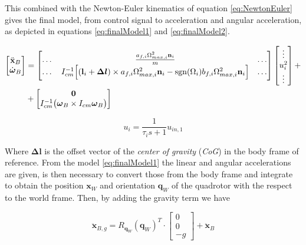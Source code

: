 \noindent This combined with the Newton-Euler kinematics of equation \eqref{eq:NewtonEuler} gives the final model, from control signal to acceleration and angular acceleration, as depicted in equations \eqref{eq:finalModel1} and \eqref{eq:finalModel2}.

\begin{equation}
	\begin{split}
		\begin{bmatrix}
			\ddot{\mathbf{x}}_B \\
			\dot{\boldsymbol{\omega}}_B
		\end{bmatrix}
		&=
		\begin{bmatrix}
			\dots & \frac{a_{f,i}\Omega_{max,i}^2\mathbf{n}_i}{m} & \dots \\
			\dots & I_{cm}^{-1}\Big[ (\mathbf{l}_i+\boldsymbol{\Delta l})\times a_{f,i}\Omega^2_{max,i}\mathbf{n}_i-\operatorname*{sgn}(\Omega_i)b_{f,i}\Omega_{max,i}^2\mathbf{n}_i\Big] & \dots
		\end{bmatrix}
		\begin{bmatrix}
			\vdots \\
			u_i^2 \\
			\vdots
		\end{bmatrix}
		+ \\
		&+
		\begin{bmatrix}
			\mathbf{0} \\
			I_{cm}^{-1}\bigl(\boldsymbol{\omega}_B \times I_{cm} \boldsymbol{\omega}_B \bigl)
		\end{bmatrix} \\
	\end{split}
	\label{eq:finalModel1}
\end{equation}

\begin{equation}
	u_i = \frac{1}{\tau_is+1}u_{in,1}
	\label{eq:finalModel2}
\end{equation}

\noindent Where $\boldsymbol{\Delta l}$ is the offset vector of the \textit{center of gravity} (\textit{CoG}) in the body frame of reference. From the model \eqref{eq:finalModel1} the linear and angular accelerations are given, is then necessary to convert those from the body frame and integrate to obtain the position $\mathbf{x}_W$ and orientation $\mathbf{q}_W$ of the quadrotor with the respect to the world frame. Then, by adding the gravity term we have

\begin{equation}
	\ddot{\mathbf{x}}_{B, g} = R_{\mathbf{q}_W}(\mathbf{q}_W)^T \cdot
	\begin{bmatrix}
		0 \\
		0 \\
		-g 
	\end{bmatrix}
	+ \ddot{\mathbf{x}}_B
	\label{eq:gravity}
\end{equation}

